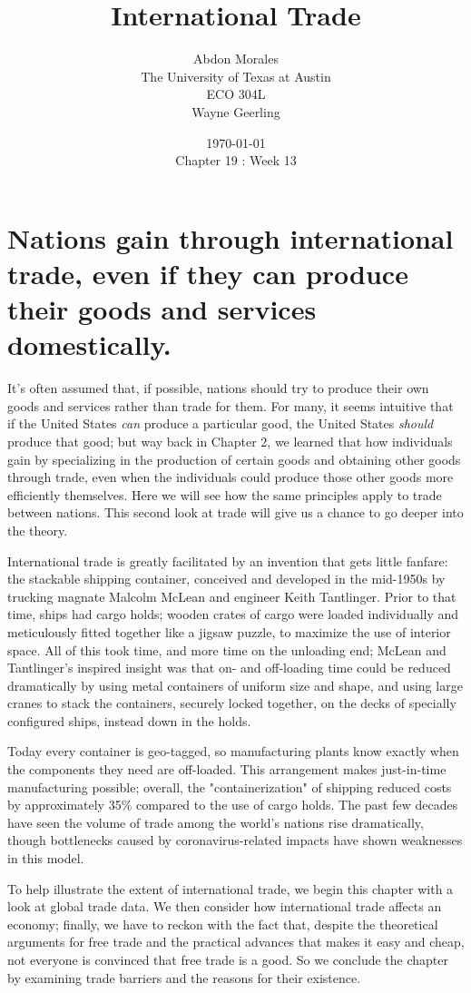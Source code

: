 \documentclass[11pt]{article} %
\title{International Trade}
\author{Abdon Morales \\ The University of Texas at Austin \\ ECO 304L \\ Wayne Geerling}
\date{\today \\ Chapter 19 : Week 13}
\begin{document}
\maketitle
\section*{\textbf{Nations gain through international trade, even if they can produce their goods and services domestically.}}
It's often assumed that, if possible, nations should try to produce their own goods and services rather than trade for them. For many, it seems intuitive that if the United States \textit{can} produce a particular good, the United States \textit{should} produce that good; but way back in Chapter 2, we learned that how individuals gain by specializing in the production of certain goods and obtaining other goods through trade, even when the individuals could produce those other goods more efficiently themselves. Here we will see how the same principles apply to trade between nations. This second look at trade will give us a chance to go deeper into the theory.

International trade is greatly facilitated by an invention that gets little fanfare: the stackable shipping container, conceived and developed in the mid-1950s by trucking magnate Malcolm McLean and engineer Keith Tantlinger. Prior to that time, ships had cargo holds; wooden crates of cargo were loaded individually and meticulously fitted together like a jigsaw puzzle, to maximize the use of interior space. All of this took time, and more time on the unloading end; McLean and Tantlinger's inspired insight was that on- and off-loading time could be reduced dramatically by using metal containers of uniform size and shape, and using large cranes to stack the containers, securely locked together, on the decks of specially configured ships, instead down in the holds.

Today every container is geo-tagged, so manufacturing plants know exactly when the components they need are off-loaded. This arrangement makes just-in-time manufacturing possible; overall, the "containerization" of shipping reduced costs by approximately 35\% compared to the use of cargo holds. The past few decades have seen the volume of trade among the world's nations rise dramatically, though bottlenecks caused by coronavirus-related impacts have shown weaknesses in this model.

To help illustrate the extent of international trade, we begin this chapter with a look at global trade data. We then consider how international trade affects an economy; finally, we have to reckon with the fact that, despite the theoretical arguments for free trade and the practical advances that makes it easy and cheap, not everyone is convinced that free trade is a good. So we conclude the chapter by examining trade barriers and the reasons for their existence.
\end{document}
